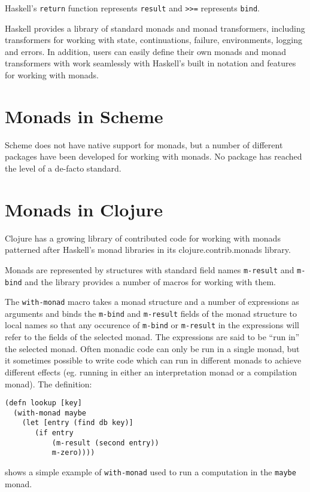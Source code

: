 \documentclass[preprint,natbib,10pt]{sigplanconf}
\begin{document}
Haskell's {\tt return} function represents {\tt result} and {\tt >>=}
represents {\tt bind}.

Haskell provides a library of standard monads and monad transformers,
including transformers for working with state, continuations, failure,
environments, logging and errors.  In addition, users can easily
define their own monads and monad transformers with work seamlessly
with Haskell's built in notation and features for working with monads.

\section{Monads in Scheme}

Scheme does not have native support for monads, but a number of
different packages have been developed for working with monads.  No
package has reached the level of a de-facto standard.

\section{Monads in Clojure}

Clojure has a growing library of contributed code for working with
monads patterned after Haskell's monad libraries in its
clojure.contrib.monads library.

Monads are represented by structures with standard field names
{\tt m-result} and {\tt m-bind} and the library provides a number of
macros for working with them.

The {\tt with-monad} macro takes a monad structure and a number of
expressions as arguments and binds the {\tt m-bind} and {\tt m-result}
fields of the monad structure to local names so that any occurence of
{\tt m-bind} or {\tt m-result} in the expressions will refer to the
fields of the selected monad.  The expressions are said to be ``run
in'' the selected monad.  Often monadic code can only be run in a
single monad, but it sometimes possible to write code which can run in
different monads to achieve different effects (eg. running in either
an interpretation monad or a compilation monad).  The definition:
\begin{verbatim}
(defn lookup [key]
  (with-monad maybe
    (let [entry (find db key)]
       (if entry
           (m-result (second entry))
           m-zero))))
\end{verbatim}
shows a simple example of {\tt with-monad} used to run a computation
in the {\tt maybe} monad.
\end{document}
